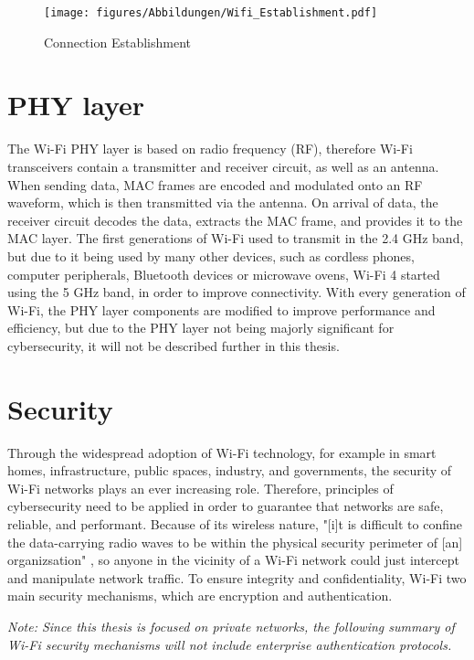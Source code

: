 \begin{figure}[h]
    \centering 
    \texttt{[image: figures/Abbildungen/Wifi\_Establishment.pdf]}
    \caption{Connection Establishment}
    \label{fig:connection_establishment}
\end{figure}

\section{PHY layer}
The Wi-Fi PHY layer is based on radio frequency (RF), therefore Wi-Fi transceivers contain a transmitter and receiver circuit, as well as an antenna.
When sending data, MAC frames are encoded and modulated onto an RF waveform, which is then transmitted via the antenna.
On arrival of data, the receiver circuit decodes the data, extracts the MAC frame, and provides it to the MAC layer.
The first generations of Wi-Fi used to transmit in the 2.4 GHz band, but due to it being used by many other devices, such as cordless phones, computer peripherals, Bluetooth devices or microwave ovens, Wi-Fi 4 started using the 5 GHz band, in order to improve connectivity. \cite[page~5,34,35]{Sankaran_Gulasekaran_2021}
With every generation of Wi-Fi, the PHY layer components are modified to improve performance and efficiency, but due to the PHY layer not being majorly significant for cybersecurity, it will not be described further in this thesis.

\section{Security}

Through the widespread adoption of Wi-Fi technology, for example in smart homes, infrastructure, public spaces, industry, and governments, the security of Wi-Fi networks plays an ever increasing role.
Therefore, principles of cybersecurity need to be applied in order to guarantee that networks are safe, reliable, and performant.
Because of its wireless nature, "[i]t is difficult to confine the data-carrying radio waves to be within the physical security perimeter of [an] organizsation" \cite[page~103]{Sankaran_Gulasekaran_2021}, so anyone in the vicinity of a Wi-Fi network could just intercept and manipulate network traffic.
To ensure integrity and confidentiality, Wi-Fi two main security mechanisms, which are encryption and authentication. \cite[page~103]{Sankaran_Gulasekaran_2021}

\textit{Note: Since this thesis is focused on private networks, the following summary of Wi-Fi security mechanisms will not include enterprise authentication protocols.}
    
